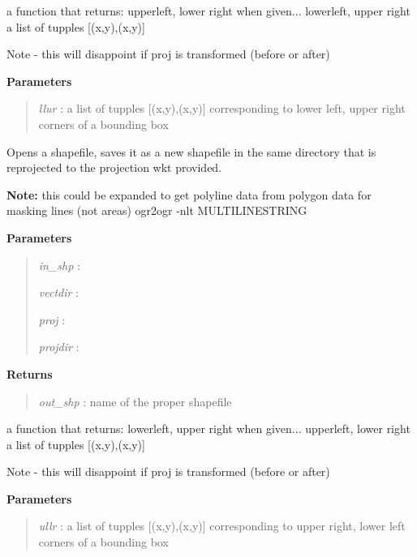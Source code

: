 \documentclass[letterpaper,10pt,english]{sphinxmanual}
\begin{document}

\begin{fulllineitems}
\label{code:Util.llur2ullr}
a function that returns:
upperleft, lower right when given...
lowerleft, upper right
a list of tupples {[}(x,y),(x,y){]}

Note - this will disappoint if proj is transformed (before or after)

\textbf{Parameters}
\begin{quote}

\emph{llur} : a list of tupples {[}(x,y),(x,y){]} corresponding to lower left, upper right corners of a bounding box
\end{quote}

\end{fulllineitems}


\begin{fulllineitems}
\label{code:Util.reprojSHP}
Opens a shapefile, saves it as a new shapefile in the same directory
that is reprojected to the projection wkt provided.

\textbf{Note:} this could be expanded to get polyline data from polygon data
for masking lines (not areas) ogr2ogr -nlt MULTILINESTRING

\textbf{Parameters}
\begin{quote}

\emph{in\_shp}  :

\emph{vectdir} :

\emph{proj}    :

\emph{projdir} :
\end{quote}

\textbf{Returns}
\begin{quote}

\emph{out\_shp} : name of the proper shapefile
\end{quote}

\end{fulllineitems}


\begin{fulllineitems}
\label{code:Util.ullr2llur}
a function that returns:
lowerleft, upper right when given...
upperleft, lower right
a list of tupples {[}(x,y),(x,y){]}

Note - this will disappoint if proj is transformed (before or after)

\textbf{Parameters}
\begin{quote}

\emph{ullr} : a list of tupples {[}(x,y),(x,y){]} corresponding to upper right, lower left corners of a bounding box
\end{quote}

\end{fulllineitems}
\end{document}
